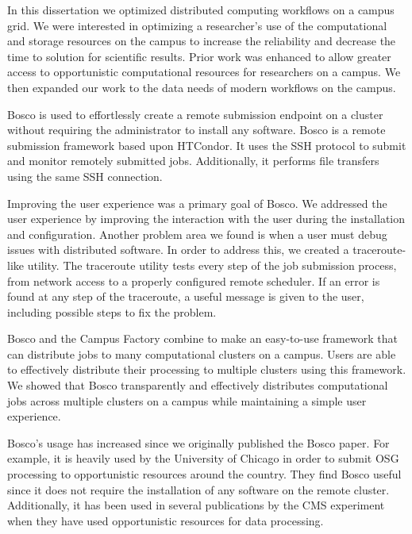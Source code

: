 \label{chapter:coordinatingstorage}

In this dissertation we optimized distributed computing workflows on a campus grid.  We were interested in optimizing a researcher's use of the computational and storage resources on the campus to increase the reliability and decrease the time to solution for scientific results.  Prior work was enhanced to allow greater access to opportunistic computational resources for researchers on a campus.  We then expanded our work to the data needs of modern workflows on the campus.

Bosco is used to effortlessly create a remote submission endpoint on a cluster without requiring the administrator to install any software.  Bosco is a remote submission framework based upon HTCondor.  It uses the SSH protocol to submit and monitor remotely submitted jobs.  Additionally, it performs file transfers using the same SSH connection.

Improving the user experience was a primary goal of Bosco.  We addressed the user experience by improving the interaction with the user during the installation and configuration.  Another problem area we found is when a user must debug issues with distributed software.  In order to address this, we created a traceroute-like utility.  The traceroute utility tests every step of the job submission process, from network access to a properly configured remote scheduler.  If an error is found at any step of the traceroute, a useful message is given to the user, including possible steps to fix the problem.

Bosco and the Campus Factory combine to make an easy-to-use framework that can distribute jobs to many computational clusters on a campus.  Users are able to effectively distribute their processing to multiple clusters using this framework.  We showed that Bosco transparently and effectively distributes computational jobs across multiple clusters on a campus while maintaining a simple user experience.

Bosco's usage has increased since we originally published the Bosco paper.  For example, it is heavily used by the University of Chicago in order to submit OSG processing to opportunistic resources around the country.  They find Bosco useful since it does not require the installation of any software on the remote cluster.  Additionally, it has been used in several publications by the CMS experiment when they have used opportunistic resources for data processing.


